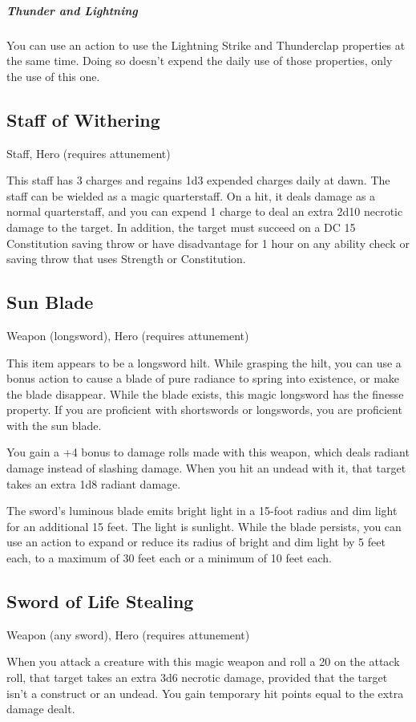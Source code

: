 \subparagraph*{Thunder and Lightning} You can use an action to use the Lightning Strike and Thunderclap properties at the same time. Doing so doesn't expend the daily use of those properties, only the use of this one.

\subsection{Staff of Withering}
Staff, Hero (requires attunement) 

This staff has 3 charges and regains 1d3 expended charges daily at dawn. The staff can be wielded as a magic quarterstaff. On a hit, it deals damage as a normal quarterstaff, and you can expend 1 charge to deal an extra 2d10 necrotic damage to the target. In addition, the target must succeed on a DC 15 Constitution saving throw or have disadvantage for 1 hour on any ability check or saving throw that uses Strength or Constitution.

\subsection{Sun Blade}
Weapon (longsword), Hero (requires attunement) 

This item appears to be a longsword hilt. While grasping the hilt, you can use a bonus action to cause a blade of pure radiance to spring into existence, or make the blade disappear. While the blade exists, this magic longsword has the finesse property. If you are proficient with shortswords or longswords, you are proficient with the sun blade.

You gain a +4 bonus to damage rolls made with this weapon, which deals radiant damage instead of slashing damage. When you hit an undead with it, that target takes an extra 1d8 radiant damage.

The sword's luminous blade emits bright light in a 15-foot radius and dim light for an additional 15 feet. The light is sunlight. While the blade persists, you can use an action to expand or reduce its radius of bright and dim light by 5 feet each, to a maximum of 30 feet each or a minimum of 10 feet each.

\subsection{Sword of Life Stealing}
Weapon (any sword), Hero (requires attunement)

When you attack a creature with this magic weapon and roll a 20 on the attack roll, that target takes an extra 3d6 necrotic damage, provided that the target isn't a construct or an undead. You gain temporary hit points equal to the extra damage dealt.

